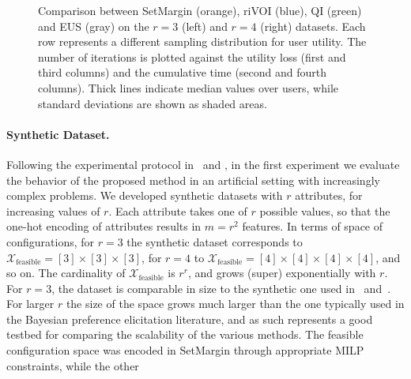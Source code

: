 \documentclass{article}
\renewcommand\[{\begin{equation}}
\renewcommand\]{\end{equation}}
\newcommand{\calvar}[1]{\ensuremath{\mathcal{#1}}}
\newcommand{\calX}{\calvar{X}}
\begin{document}
\begin{figure}[t]
{\begin{tabular}{ccccc}
        \\
        \hline
    \end{tabular}
    }
    \caption{\label{fig:comparison} Comparison between {\sc SetMargin}
      (orange), {\sc riVOI} (blue), {\sc QI} (green) and {\sc EUS}
      (gray) on the $r=3$ (left) and $r=4$ (right) datasets. Each row
      represents a different sampling distribution for user utility.
      The number of iterations is plotted against the utility loss
      (first and third columns) and the cumulative time (second and
      fourth columns). Thick lines indicate median values over users,
      while standard deviations are shown as shaded areas.}
\end{figure}

\paragraph{Synthetic Dataset.} Following the experimental protocol
in~\cite{guo2010real} and \cite{viappiani2010optimal}, in the first
experiment we evaluate the behavior of the proposed method in an
artificial setting with increasingly complex problems. We developed
synthetic datasets with $r$ attributes, for increasing values of $r$.
Each attribute takes one of $r$ possible values, so that the one-hot
encoding of attributes results in $m=r^2$ features. In terms of space
of configurations, for $r=3$ the synthetic dataset corresponds to 
$\calX_\text{feasible} = [3] \times [3] \times [3]$, for $r=4$ to
$\calX_\text{feasible} = [4] \times [4] \times [4] \times [4]$, and so on. The
cardinality of $\calX_\text{feasible}$ is $r^r$, and grows (super)
exponentially with $r$.
For $r=3$, the dataset is comparable in size to the synthetic one used
in~\cite{guo2010real} and~\cite{viappiani2010optimal}.
For larger $r$ the size of the space grows much larger than the one
typically used in the Bayesian preference elicitation literature, and
as such represents a good testbed for comparing the scalability of the
various methods. The feasible configuration space was encoded in {\sc
  SetMargin} through appropriate MILP constraints, while the other
\end{document}
